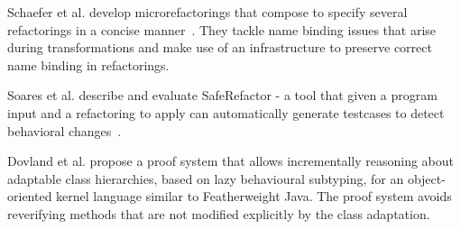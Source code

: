Schaefer et al. develop microrefactorings that compose to specify several refactorings in a concise manner~\cite{Schafer-OOPSLA-2010}.
They tackle name binding issues that arise during transformations and make use of an infrastructure to preserve correct name binding in refactorings.


Soares et al. describe and evaluate SafeRefactor - a tool that given a program input and a refactoring to apply can automatically generate testcases to detect behavioral changes~\cite{Soares-IEEE-2010}.


Dovland et al. \cite{dovland:adaptableclass2015} propose a proof system that allows
incrementally reasoning about adaptable class hierarchies, based on
lazy behavioural subtyping, for 
an object-oriented kernel language similar to Featherweight Java.  The
proof system avoids reverifying methods that are not modified
explicitly by the class adaptation.



